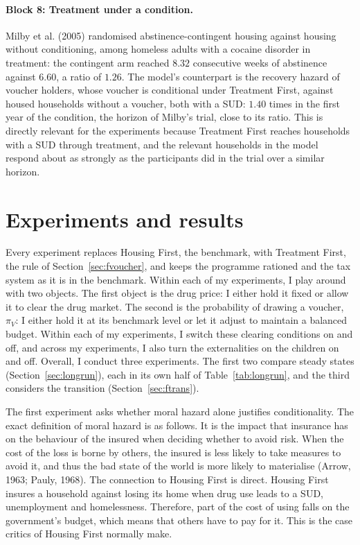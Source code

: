 \documentclass[10pt]{article}
\begin{document}
 \paragraph{Block 8:  Treatment under a condition.}
  Milby et al. (2005)  randomised abstinence-contingent housing against housing without conditioning, among homeless adults with a cocaine disorder in treatment: the contingent arm reached $8.32$ consecutive weeks of abstinence against $6.60$, a ratio of $1.26$. The model's counterpart is the recovery hazard of voucher holders, whose voucher is conditional under Treatment First, against housed households without a voucher, both with a SUD: $1.40$ times in the first year of the condition, the horizon of Milby's trial, close to its ratio.   This is directly relevant for the experiments because Treatment First reaches households with a SUD through treatment, and the relevant households in the model respond about as strongly as the participants did in the trial over a similar horizon.






\section{Experiments and results}\label{sec:experiments}

Every experiment replaces Housing First, the benchmark, with Treatment First, the rule of Section~\ref{sec:fvoucher}, and keeps the programme rationed and the tax system as it is in the benchmark.     Within each of my experiments, I play around with two objects. The first object is the drug price: I either hold it fixed or allow it to clear the drug market. The second is the probability of drawing a voucher, $\pi_V$: I either hold it at its benchmark level or let it adjust to maintain a balanced budget. Within each of my experiments, I switch these clearing conditions on and off, and across my experiments, I also turn the externalities on the children on and off.  Overall, I conduct three experiments. The first two compare steady states (Section~\ref{sec:longrun}), each in its own half of Table~\ref{tab:longrun}, and the third considers the transition (Section~\ref{sec:ftrans}).

The first experiment asks whether moral hazard alone justifies conditionality.   The exact definition of moral hazard is as follows. It is the impact that insurance has on the behaviour of the insured when deciding whether to avoid risk. When the cost of the loss is borne by others, the insured is less likely to take measures to avoid it, and thus the bad state of the world is more likely to materialise (Arrow, 1963; Pauly, 1968). The connection to Housing First is direct. Housing First insures a household against losing its home when drug use leads to a SUD, unemployment and homelessness. Therefore, part of the cost of using falls on the government's budget, which means that others have to pay for it. This is the case critics of Housing First normally make.
\end{document}
